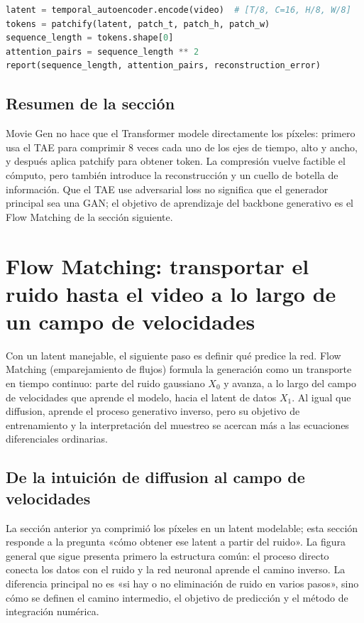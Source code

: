 \documentclass[a4paper]{article}
\begin{document}
\begin{lstlisting}[language=Python,caption={Cálculo mínimo de la compresión de video y del token accounting}]
latent = temporal_autoencoder.encode(video)  # [T/8, C=16, H/8, W/8]
tokens = patchify(latent, patch_t, patch_h, patch_w)
sequence_length = tokens.shape[0]
attention_pairs = sequence_length ** 2
report(sequence_length, attention_pairs, reconstruction_error)
\end{lstlisting}

\subsection{Resumen de la sección}

Movie Gen no hace que el Transformer modele directamente los píxeles: primero usa el TAE para comprimir 8 veces cada uno de los ejes de tiempo, alto y ancho, y después aplica patchify para obtener token. La compresión vuelve factible el cómputo, pero también introduce la reconstrucción y un cuello de botella de información. Que el TAE use adversarial loss no significa que el generador principal sea una GAN; el objetivo de aprendizaje del backbone generativo es el Flow Matching de la sección siguiente.
\section{Flow Matching: transportar el ruido hasta el video a lo largo de un campo de velocidades}

Con un latent manejable, el siguiente paso es definir qué predice la red. Flow Matching (emparejamiento de flujos) formula la generación como un transporte en tiempo continuo: parte del ruido gaussiano $X_0$ y avanza, a lo largo del campo de velocidades que aprende el modelo, hacia el latent de datos $X_1$. Al igual que diffusion, aprende el proceso generativo inverso, pero su objetivo de entrenamiento y la interpretación del muestreo se acercan más a las ecuaciones diferenciales ordinarias.

\subsection{De la intuición de diffusion al campo de velocidades}

La sección anterior ya comprimió los píxeles en un latent modelable; esta sección responde a la pregunta «cómo obtener ese latent a partir del ruido». La figura general que sigue presenta primero la estructura común: el proceso directo conecta los datos con el ruido y la red neuronal aprende el camino inverso. La diferencia principal no es «si hay o no eliminación de ruido en varios pasos», sino cómo se definen el camino intermedio, el objetivo de predicción y el método de integración numérica.
\end{document}
